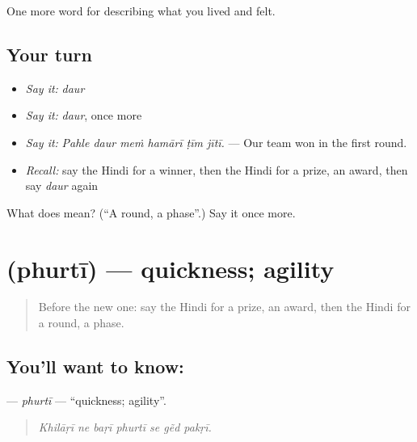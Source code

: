 \begin{grammarlens}[title={What you've built}]
One more word for describing what you lived and felt.
\end{grammarlens}

\subsection*{Your turn}
\begin{itemize}
\raggedright
  \item \emph{Say it:} \emph{daur}
  \item \emph{Say it:} \emph{daur}, once more
  \item \emph{Say it:} \emph{Pahle daur meṁ hamārī ṭīm jītī.} — Our team won in the first round.
  \item \emph{Recall:} say the Hindi for a winner, then the Hindi for a prize, an award, then say \emph{daur} again
\end{itemize}

\begin{tcolorbox}[breakable,colback=teal!4,colframe=teal!35!black,title={Before you move on}]
What does  mean? (\textquotedblleft{}A round, a phase\textquotedblright{}.) Say it once more.
\end{tcolorbox}
\section[\texorpdfstring{\hi{फुर्ती} (phurtī)}{फुर्ती (phurtī)}]{ (phurtī) — quickness; agility}

\label{lesson:HI-C535-phurti}



\begin{quote}
Before the new one: say the Hindi for a prize, an award, then the Hindi for a round, a phase.
\end{quote}

\subsection*{You'll want to know: }
\textbf{} — \emph{phurtī} — \textquotedblleft{}quickness; agility\textquotedblright{}.

\begin{quote}
      
\end{quote}

\begin{quote}
\emph{Khilāṛī ne baṛī phurtī se gẽd pakṛī.}
\end{quote}

